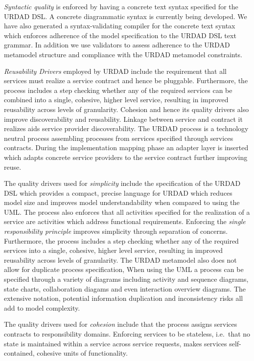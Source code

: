 \emph{Syntactic quality} is enforced by having a concrete text syntax specified for the URDAD DSL. A concrete diagrammatic syntax is currently being developed. We have also generated a syntax-validating compiler for the concrete text syntax which enforces adherence of the model specification to the URDAD DSL text grammar. In addition we use validators to assess adherence to the URDAD metamodel structure and compliance with the URDAD metamodel constraints.

\emph{Reusability Drivers} employed by URDAD include the requirement that all services must realize a service contract and hence be pluggable. Furthermore, the process includes a step checking whether any of the required services can be combined into a single, cohesive, higher level service, resulting in improved reusability across levels of granularity. Cohesion and hence its quality drivers also improve discoverability and reusability. Linkage between service and contract it realizes aids service provider discoverability. The URDAD process is a technology neutral process assembling processes from services specified through services contracts. During the implementation mapping phase an adapter layer is inserted which adapts concrete service providers to the service contract further improving reuse.

The quality drivers used for \emph{simplicity} include the specification of  the URDAD DSL which provides a compact, precise language for URDAD which reduces model size and improves model understandability when compared to using the UML. The process also enforces that all activities specified for the realization of a service are activities which address functional requirements. Enforcing the \emph{single responsibility principle} improves simplicity through separation of concerns. Furthermore, the process includes a step checking whether any of the required services into a single, cohesive, higher level service, resulting in improved reusability across levels of granularity. The URDAD metamodel also does not allow for duplicate process specification, When using the UML a process can be specified through a variety of diagrams including activity and sequence diagrams, state charts, collaboration diagams and even interaction overview diagrams. The extensive notation, potential information duplication and inconsistency risks all add to model complexity.

The quality drivers used for \emph{cohesion} include that the process assigns services contracts to responsibility domains. Enforcing services to be stateless, i.e.\ that no state is maintained within a service across service requests, makes services self-contained, cohesive units of functionality.

